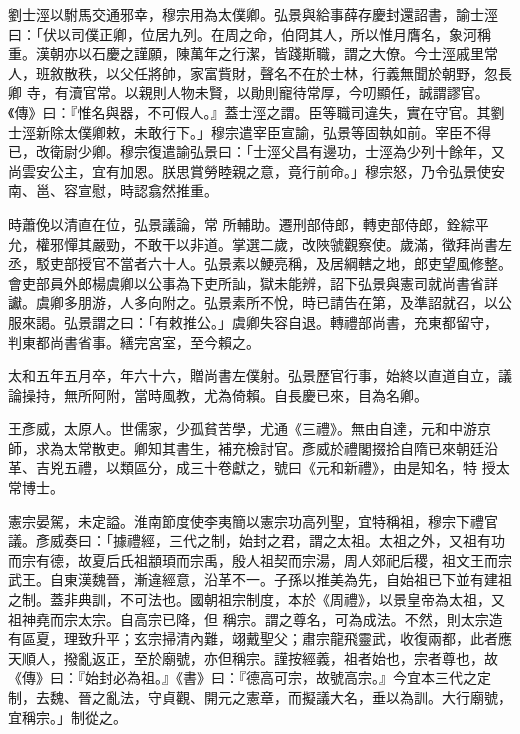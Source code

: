 \begin{pinyinscope}
 劉士涇以駙馬交通邪幸，穆宗用為太僕卿。弘景與給事薛存慶封還詔書，諭士涇曰：「伏以司僕正卿，位居九列。在周之命，伯冏其人，所以惟月膺名，象河稱重。漢朝亦以石慶之謹願，陳萬年之行潔，皆踐斯職，謂之大僚。今士涇戚里常人，班敘散秩，以父任將帥，家富貲財，聲名不在於士林，行義無聞於朝野，忽長卿
 寺，有瀆官常。以親則人物未賢，以勛則寵待常厚，今叨顯任，誠謂謬官。《傳》曰：『惟名與器，不可假人。』蓋士涇之謂。臣等職司違失，實在守官。其劉士涇新除太僕卿敕，未敢行下。」穆宗遣宰臣宣諭，弘景等固執如前。宰臣不得已，改衛尉少卿。穆宗復遣諭弘景曰：「士涇父昌有邊功，士涇為少列十餘年，又尚雲安公主，宜有加恩。朕思賞勞睦親之意，竟行前命。」穆宗怒，乃令弘景使安南、邕、容宣慰，時認翕然推重。



 時蕭俛以清直在位，弘景議論，常
 所輔助。遷刑部侍郎，轉吏部侍郎，銓綜平允，權邪憚其嚴勁，不敢干以非道。掌選二歲，改陜虢觀察使。歲滿，徵拜尚書左丞，駁吏部授官不當者六十人。弘景素以鯁亮稱，及居綱轄之地，郎吏望風修整。會吏部員外郎楊虞卿以公事為下吏所訕，獄未能辨，詔下弘景與憲司就尚書省詳讞。虞卿多朋游，人多向附之。弘景素所不悅，時已請告在第，及準詔就召，以公服來謁。弘景謂之曰：「有敕推公。」虞卿失容自退。轉禮部尚書，充東都留守，
 判東都尚書省事。繕完宮室，至今賴之。



 太和五年五月卒，年六十六，贈尚書左僕射。弘景歷官行事，始終以直道自立，議論操持，無所阿附，當時風教，尤為倚賴。自長慶已來，目為名卿。



 王彥威，太原人。世儒家，少孤貧苦學，尤通《三禮》。無由自達，元和中游京師，求為太常散吏。卿知其書生，補充檢討官。彥威於禮閣掇拾自隋已來朝廷沿革、吉兇五禮，以類區分，成三十卷獻之，號曰《元和新禮》，由是知名，特
 授太常博士。



 憲宗晏駕，未定謚。淮南節度使李夷簡以憲宗功高列聖，宜特稱祖，穆宗下禮官議。彥威奏曰：「據禮經，三代之制，始封之君，謂之太祖。太祖之外，又祖有功而宗有德，故夏后氏祖顓頊而宗禹，殷人祖契而宗湯，周人郊祀后稷，祖文王而宗武王。自東漢魏晉，漸違經意，沿革不一。子孫以推美為先，自始祖已下並有建祖之制。蓋非典訓，不可法也。國朝祖宗制度，本於《周禮》，以景皇帝為太祖，又祖神堯而宗太宗。自高宗已降，但
 稱宗。謂之尊名，可為成法。不然，則太宗造有區夏，理致升平；玄宗掃清內難，翊戴聖父；肅宗龍飛靈武，收復兩都，此者應天順人，撥亂返正，至於廟號，亦但稱宗。謹按經義，祖者始也，宗者尊也，故《傳》曰：『始封必為祖。』《書》曰：『德高可宗，故號高宗。』今宜本三代之定制，去魏、晉之亂法，守貞觀、開元之憲章，而擬議大名，垂以為訓。大行廟號，宜稱宗。」制從之。




\end{pinyinscope}
